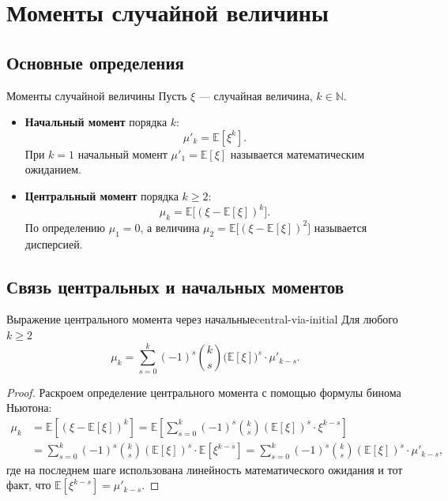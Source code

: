 
\section{Моменты случайной величины}

\subsection{Основные определения}


\begin{Definition}{Моменты случайной величины}{}
	Пусть $\xi$ — случайная величина, $k \in \mathbb N$.
	
	\begin{itemize}
		\item \textbf{Начальный момент} порядка $k$:
		\[
		\mu'_k = \mathbb{E}[\xi^k].
		\]
		При $k=1$ начальный момент $\mu'_1 = \mathbb{E}[\xi]$
		называется математическим ожиданием.
		
		\item \textbf{Центральный момент} порядка $k \ge 2$:
		\[
		\mu_k = \mathbb{E}\big[(\xi - \mathbb{E}[\xi])^k\big].
		\]
		По определению $\mu_1 = 0$, а величина $\mu_2 = \mathbb{E}\big[(\xi - \mathbb{E}[\xi])^2\big]$ называется дисперсией.
	\end{itemize}
\end{Definition}

\subsection{Связь центральных и начальных моментов}

\begin{Theorem}{Выражение центрального момента через начальные}{central-via-initial}
	Для любого $k \geq 2$
	\[
	\mu_k = \sum_{s=0}^{k} (-1)^s \binom{k}{s} \bigl(\mathbb{E}[\xi]\bigr)^s \cdot \mu'_{k-s}.
	\]
\end{Theorem}

\begin{proof}
Раскроем определение центрального момента с помощью формулы бинома Ньютона:
\begin{align*}
	\mu_k
	&= \mathbb{E}\!\left[(\xi - \mathbb{E}[\xi])^k\right]
	= \mathbb{E}\!\left[\sum_{s=0}^{k} (-1)^s \binom{k}{s} (\mathbb{E}[\xi])^s \cdot \xi^{k-s}\right] \\
	&= \sum_{s=0}^{k} (-1)^s \binom{k}{s} (\mathbb{E}[\xi])^s \cdot \mathbb{E}[\xi^{k-s}]
	= \sum_{s=0}^{k} (-1)^s \binom{k}{s} (\mathbb{E}[\xi])^s \cdot \mu'_{k-s},
\end{align*}
где на последнем шаге использована линейность математического ожидания и
тот факт, что $\mathbb{E}[\xi^{k-s}] = \mu'_{k-s}$.
\end{proof}

